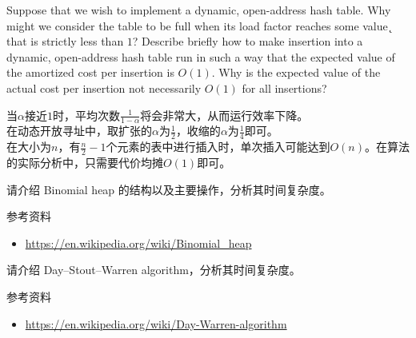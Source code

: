 \documentclass[a4paper, justified]{tufte-handout}
\begin{document}
\begin{problem}[TC 17.4-1]
Suppose that we wish to implement a dynamic, open-address hash table. Why might we consider the table to be full when its load factor reaches some value  ̨ that is strictly less than $1$? Describe briefly how to make insertion into a dynamic, open-address hash table run in such a way that the expected value of the amortized cost per insertion is $O(1)$. Why is the expected value of the actual cost per insertion not necessarily $O(1)$ for all insertions?
\end{problem}

\begin{solution}
    当$\alpha$接近$1$时，平均次数$\frac{1}{1-\alpha}$将会非常大，从而运行效率下降。\\
    在动态开放寻址中，取扩张的$\alpha$为$\frac{1}{2}$，收缩的$\alpha$为$\frac{1}{4}$即可。\\
    在大小为$n$，有$\frac{n}{2}-1$个元素的表中进行插入时，单次插入可能达到$O(n)$。在算法的实际分析中，只需要代价均摊$O(1)$即可。
\end{solution}

\beginoptional



\beginot
\begin{ot}
    请介绍 Binomial heap 的结构以及主要操作，分析其时间复杂度。

    \noindent 参考资料
    \begin{itemize}
        \item \href{https://en.wikipedia.org/wiki/Binomial_heap}{https://en.wikipedia.org/wiki/Binomial\_heap}
    \end{itemize}
\end{ot}


\begin{ot}
    请介绍 Day–Stout–Warren algorithm，分析其时间复杂度。

    \noindent 参考资料
    \begin{itemize}
        \item \href{https://en.wikipedia.org/wiki/Day%E2%80%93Stout%E2%80%93Warren_algorithm}{https://en.wikipedia.org/wiki/Day-Warren-algorithm}
    \end{itemize}
\end{ot}
\end{document}
